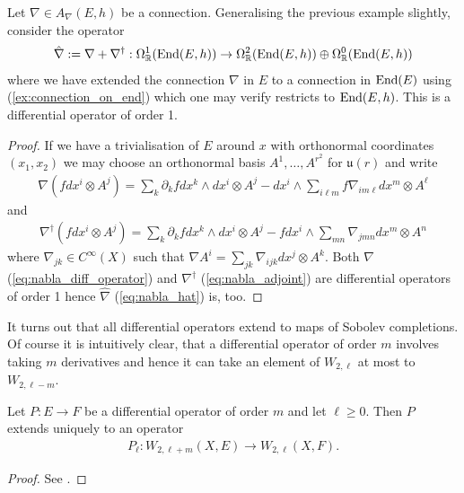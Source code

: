 \documentclass[12pt]{ociamthesis}  %
\begin{document}
\begin{example}
  Let $\nabla\in A_\nabla(E,h)$ be a connection. Generalising the previous
  example slightly, consider the operator 
  \begin{align}\label{eq:nabla_hat}
    \hat\nabla := \nabla + \nabla^\dagger :
    \Omega^1_{\mathbb R}(\operatorname{End}(E,h)) \to
    \Omega^2_{\mathbb R}(\operatorname{End}(E,h)) \oplus
    \Omega^0_{\mathbb R}(\operatorname{End}(E,h))
  \end{align}
  where we have extended the connection $\nabla$ in $E$ to a connection
  in $\operatorname{End}(E)$ using (\ref{ex:connection_on_end}) which
  one may verify restricts to $\operatorname{End}(E,h)$. This is a
  differential operator of order 1.
  \begin{proof}
    If we have a trivialisation of $E$ around $x$ with orthonormal coordinates
    $(x_1,x_2)$ we may choose an orthonormal basis $A^1,\ldots,A^{r^2}$ for
    $\mathfrak u(r)$ and write
    \begin{align}\label{eq:nabla_diff_operator}
      \nabla\left(fdx^i\otimes A^j\right)
      = \sum_k \partial_k f dx^k\wedge dx^i \otimes A^j
      - dx^i\wedge\sum_{i\ell m} f\nabla_{im\ell}dx^m\otimes A^\ell
    \end{align}
    and
    \begin{align}\label{eq:nabla_adjoint}
      \nabla^\dagger\left(fdx^i \otimes A^j\right)
      = \sum_k \partial_k fdx^k\wedge dx^i\otimes A^j
      - fdx^i \wedge \sum_{mn} \nabla_{jmn}dx^m\otimes A^n
    \end{align}
    where $\nabla_{jk}\in C^\infty(X)$ such that
    $\nabla A^i = \sum_{jk}\nabla_{ijk}dx^j\otimes A^k$. Both
    $\nabla$ (\ref{eq:nabla_diff_operator}) and $\nabla^\dagger$
    (\ref{eq:nabla_adjoint}) are differential operators of order 1 hence
    $\hat\nabla$ (\ref{eq:nabla_hat}) is, too.
  \end{proof}
\end{example}

It turns out that all differential operators extend to maps of Sobolev
completions. Of course it is intuitively clear, that a differential
operator of order $m$ involves taking $m$ derivatives and hence
it can take an element of $W_{2,\ell}$ at most to $W_{2,\ell-m}$.

\begin{theorem}
  Let $P:E\to F$ be a differential operator of order $m$ and
  let $\ell \geq 0$. Then $P$ extends uniquely to an operator
  \begin{align}\label{eq:fredholm_extension}
    P_\ell : W_{2,\ell+m}(X,E) \to W_{2,\ell}(X,F).
  \end{align}
  \begin{proof}
    See \cite[{Proposition 3.8.4}]{bc2009}.
  \end{proof}
\end{theorem}
\end{document}
